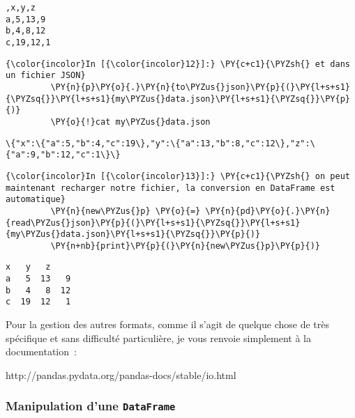     \begin{Verbatim}[commandchars=\\\{\}]
,x,y,z
a,5,13,9
b,4,8,12
c,19,12,1

    \end{Verbatim}

    \begin{Verbatim}[commandchars=\\\{\}]
{\color{incolor}In [{\color{incolor}12}]:} \PY{c+c1}{\PYZsh{} et dans un fichier JSON}
         \PY{n}{p}\PY{o}{.}\PY{n}{to\PYZus{}json}\PY{p}{(}\PY{l+s+s1}{\PYZsq{}}\PY{l+s+s1}{my\PYZus{}data.json}\PY{l+s+s1}{\PYZsq{}}\PY{p}{)}
         \PY{o}{!}cat my\PYZus{}data.json
\end{Verbatim}


    \begin{Verbatim}[commandchars=\\\{\}]
\{"x":\{"a":5,"b":4,"c":19\},"y":\{"a":13,"b":8,"c":12\},"z":\{"a":9,"b":12,"c":1\}\}
    \end{Verbatim}

    \begin{Verbatim}[commandchars=\\\{\}]
{\color{incolor}In [{\color{incolor}13}]:} \PY{c+c1}{\PYZsh{} on peut maintenant recharger notre fichier, la conversion en DataFrame est automatique}
         \PY{n}{new\PYZus{}p} \PY{o}{=} \PY{n}{pd}\PY{o}{.}\PY{n}{read\PYZus{}json}\PY{p}{(}\PY{l+s+s1}{\PYZsq{}}\PY{l+s+s1}{my\PYZus{}data.json}\PY{l+s+s1}{\PYZsq{}}\PY{p}{)}
         \PY{n+nb}{print}\PY{p}{(}\PY{n}{new\PYZus{}p}\PY{p}{)}
\end{Verbatim}


    \begin{Verbatim}[commandchars=\\\{\}]
    x   y   z
a   5  13   9
b   4   8  12
c  19  12   1

    \end{Verbatim}

    Pour la gestion des autres formats, comme il s'agit de quelque chose de
très spécifique et sans difficulté particulière, je vous renvoie
simplement à la documentation~:

http://pandas.pydata.org/pandas-docs/stable/io.html

    \hypertarget{manipulation-dune-dataframe}{%
\subsubsection{\texorpdfstring{Manipulation d'une
\texttt{DataFrame}}{Manipulation d'une DataFrame}}\label{manipulation-dune-dataframe}}

